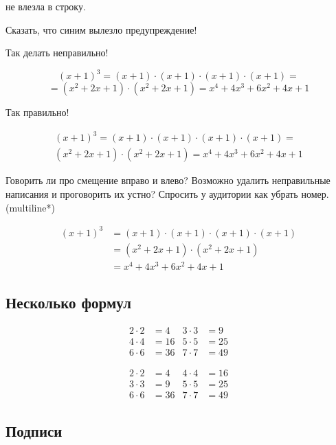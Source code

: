 \documentclass[12pt, a4paper]{article}
\begin{document}
не влезла в строку.

Сказать, что синим вылезло предупреждение!

Так делать неправильно!

\[  (x+1)^3 = (x+1) \cdot (x+1) \cdot (x+1) \cdot (x+1) = \]
\[= (x^2 + 2x + 1) \cdot (x^2 + 2x + 1) = x^4 + 4x^3 + 6x^2 + 4x+ 1 \]

Так правильно!

\begin{multline}
	(x+1)^3 = (x+1) \cdot (x+1) \cdot (x+1) \cdot (x+1) = \\ 
	(x^2 + 2x + 1) \cdot (x^2 + 2x + 1) = x^4 + 4x^3 + 6x^2 + 4x+ 1 
\end{multline}

Говорить ли про смещение вправо и влево? Возможно удалить неправильные написания и проговорить их устно? Спросить у аудитории как убрать номер. (multiline*)

\begin{align*}
	(x+1)^3 & = (x+1) \cdot (x+1) \cdot (x+1) \cdot (x+1) \\ 
	        & = (x^2 + 2x + 1)  \cdot (x^2 + 2x + 1)    \\ 
	        & =  x^4 + 4x^3 + 6x^2 + 4x+ 1  
\end{align*}






\subsection{Несколько формул}

\begin{align}
	2 \cdot 2 &= 4 & 3 \cdot 3 &= 9 \\
	4 \cdot 4 &= 16 & 5 \cdot 5 &= 25 \\
	6 \cdot 6 &= 36 & 7 \cdot 7 &= 49 
\end{align}

\begin{equation}
	\begin{aligned}
		2 \cdot 2 &= 4 & 4 \cdot 4 &= 16 \\
		3 \cdot 3 &= 9 & 5 \cdot 5 &= 25 \\
		6 \cdot 6 &= 36 & 7 \cdot 7 &= 49 
	\end{aligned}
\end{equation}






\subsection{Подписи}
\end{document}
